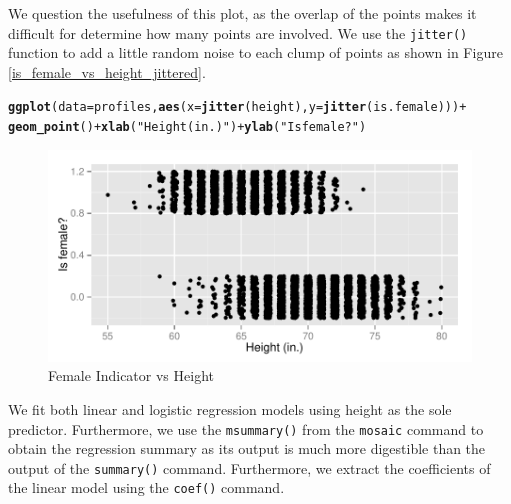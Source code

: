 \documentclass{article}\usepackage[]{graphicx}\usepackage[]{color}
\makeatletter
\def\maxwidth{ %
  \ifdim\Gin@nat@width>\linewidth
    \linewidth
  \else
    \Gin@nat@width
  \fi
}
\newcommand{\hlstr}[1]{\textcolor[rgb]{0.192,0.494,0.8}{#1}}%
\newcommand{\hlopt}[1]{\textcolor[rgb]{0,0,0}{#1}}%
\newcommand{\hlstd}[1]{\textcolor[rgb]{0.345,0.345,0.345}{#1}}%
\newcommand{\hlkwc}[1]{\textcolor[rgb]{0.333,0.667,0.333}{#1}}%
\newcommand{\hlkwd}[1]{\textcolor[rgb]{0.737,0.353,0.396}{\textbf{#1}}}%
\newenvironment{kframe}{%
 \def\at@end@of@kframe{}%
 \ifinner\ifhmode%
  \def\at@end@of@kframe{\end{minipage}}%
  \begin{minipage}{\columnwidth}%
 \fi\fi%
 \def\FrameCommand##1{\hskip\@totalleftmargin \hskip-\fboxsep
 \colorbox{shadecolor}{##1}\hskip-\fboxsep
     \hskip-\linewidth \hskip-\@totalleftmargin \hskip\columnwidth}%
 \MakeFramed {\advance\hsize-\width
   \@totalleftmargin\z@ \linewidth\hsize
   \@setminipage}}%
 {\par\unskip\endMakeFramed%
 \at@end@of@kframe}
\newenvironment{knitrout}{}{} %
\makeatother
\begin{document}
We question the usefulness of this plot, as the overlap of the points makes it difficult for determine how many points are involved.  We use the \verb#jitter()# function to add a little random noise to each clump of points as shown in Figure \ref{is_female_vs_height_jittered}.

\begin{knitrout}
\color{fgcolor}\begin{kframe}
\begin{alltt}
\hlkwd{ggplot}\hlstd{(}\hlkwc{data}\hlstd{=profiles,} \hlkwd{aes}\hlstd{(}\hlkwc{x}\hlstd{=}\hlkwd{jitter}\hlstd{(height),} \hlkwc{y}\hlstd{=}\hlkwd{jitter}\hlstd{(is.female)))} \hlopt{+}
  \hlkwd{geom_point}\hlstd{()} \hlopt{+} \hlkwd{xlab}\hlstd{(}\hlstr{"Height (in.)"}\hlstd{)} \hlopt{+} \hlkwd{ylab}\hlstd{(}\hlstr{"Is female?"}\hlstd{)}
\end{alltt}
\end{kframe}\begin{figure}

{\centering \includegraphics[width=\maxwidth]{figure/is_female_vs_height_jitered-1} 

}

\caption[Female Indicator vs Height]{Female Indicator vs Height}\label{fig:is_female_vs_height_jitered}
\end{figure}


\end{knitrout}

We fit both linear and logistic regression models using height as the sole predictor.  Furthermore, we use the \verb#msummary()# from the \verb#mosaic# command to obtain the regression summary as its output is much more digestible than the output of the \verb#summary()# command.  Furthermore, we extract the coefficients of the linear model using the \verb#coef()# command.  
\end{document}

